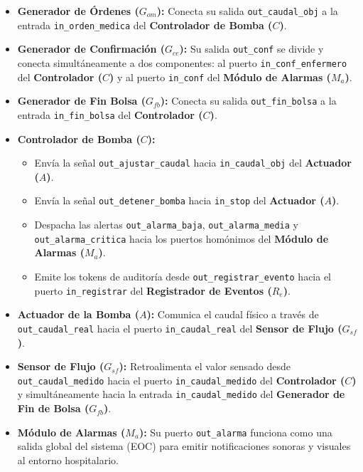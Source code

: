 \begin{itemize}
    \item \textbf{Generador de Órdenes ($G_{om}$):} Conecta su salida \texttt{out\_caudal\_obj} a la entrada \texttt{in\_orden\_medica} del \textbf{Controlador de Bomba ($C$)}.
    \item \textbf{Generador de Confirmación ($G_{ce}$):} Su salida \texttt{out\_conf} se divide y conecta simultáneamente a dos componentes: al puerto \texttt{in\_conf\_enfermero} del \textbf{Controlador ($C$)} y al puerto \texttt{in\_conf} del \textbf{Módulo de Alarmas ($M_a$)}.
    \item \textbf{Generador de Fin Bolsa ($G_{fb}$):} Conecta su salida \texttt{out\_fin\_bolsa} a la entrada \texttt{in\_fin\_bolsa} del \textbf{Controlador ($C$)}.
    \item \textbf{Controlador de Bomba ($C$):}
    \begin{itemize}
        \item Envía la señal \texttt{out\_ajustar\_caudal} hacia \texttt{in\_caudal\_obj} del \textbf{Actuador ($A$)}.
        \item Envía la señal \texttt{out\_detener\_bomba} hacia \texttt{in\_stop} del \textbf{Actuador ($A$)}.
        \item Despacha las alertas \texttt{out\_alarma\_baja}, \texttt{out\_alarma\_media} y \texttt{out\_alarma\_critica} hacia los puertos homónimos del \textbf{Módulo de Alarmas ($M_a$)}.
        \item Emite los tokens de auditoría desde \texttt{out\_registrar\_evento} hacia el puerto \texttt{in\_registrar} del \textbf{Registrador de Eventos ($R_e$)}.
    \end{itemize}
    \item \textbf{Actuador de la Bomba ($A$):} Comunica el caudal físico a través de \texttt{out\_caudal\_real} hacia el puerto \texttt{in\_caudal\_real} del \textbf{Sensor de Flujo ($G_{sf}$)}.
    \item \textbf{Sensor de Flujo ($G_{sf}$):} Retroalimenta el valor sensado desde \texttt{out\_caudal\_medido} hacia el puerto \texttt{in\_caudal\_medido} del \textbf{Controlador ($C$)} y simultáneamente hacia la entrada \texttt{in\_caudal\_medido} del \textbf{Generador de Fin de Bolsa ($G_{fb}$)}.
    \item \textbf{Módulo de Alarmas ($M_a$):} Su puerto \texttt{out\_alarma} funciona como una salida global del sistema (EOC) para emitir notificaciones sonoras y visuales al entorno hospitalario.
\end{itemize}


